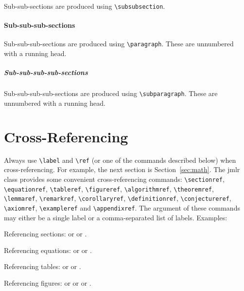 \documentclass[pmlr]{jmlr}%
\begin{document}
Sub-sub-sections are produced using \verb|\subsubsection|.

\paragraph{Sub-sub-sub-sections}

Sub-sub-sub-sections are produced using \verb|\paragraph|.
These are unnumbered with a running head.

\subparagraph{Sub-sub-sub-sub-sections}

Sub-sub-sub-sub-sections are produced using \verb|\subparagraph|.
These are unnumbered with a running head.

\section{Cross-Referencing}

Always use \verb|\label| and \verb|\ref| (or one of the commands
described below) when cross-referencing.  For example, the next
section is Section~\ref{sec:math}. The \textsf{jmlr} class
provides some convenient cross-referencing commands:
\verb|\sectionref|, \verb|\equationref|, \verb|\tableref|,
\verb|\figureref|, \verb|\algorithmref|, \verb|\theoremref|,
\verb|\lemmaref|, \verb|\remarkref|, \verb|\corollaryref|,
\verb|\definitionref|, \verb|\conjectureref|, \verb|\axiomref|,
\verb|\exampleref| and \verb|\appendixref|. The argument of these
commands may either be a single label or a comma-separated list
of labels. Examples:

Referencing sections:  or
 or
.

Referencing equations:  or
 or
.

Referencing tables:  or
 or
.

Referencing figures:  or
 or
 or
.
\end{document}
